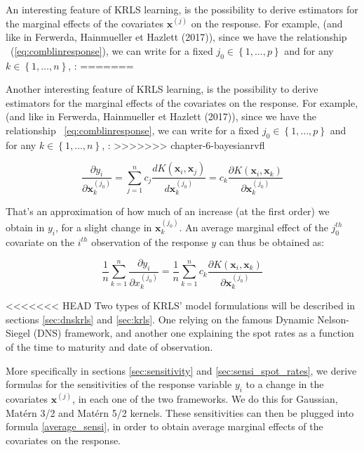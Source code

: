 An interesting feature of KRLS learning, is the possibility to derive estimators for the  marginal effects of the covariates $\textbf{x}^{(j)}$ on the response. For example, (and like in Ferwerda, Hainmueller et Hazlett (2017)), since we have the relationship ~(\ref{eq:comblinresponse}), we can write for a fixed $j_0 \in \left \lbrace 1, \ldots, p \right \rbrace$ and for any $k \in \left \lbrace 1, \ldots, n \right \rbrace $, :
=======

\medskip

Another interesting feature of KRLS learning, is the possibility to derive estimators for the  marginal effects of the covariates on the response. For example, (and like in Ferwerda, Hainmueller et Hazlett (2017)), since we have the relationship ~\ref{eq:comblinresponse}, we can write for a fixed $j_0 \in \left \lbrace 1, \ldots, p \right \rbrace$ and for any $k \in \left \lbrace 1, \ldots, n \right \rbrace $, :
>>>>>>> chapter-6-bayesianrvfl

\begin{equation}
\frac{\partial y_i}{\partial \textbf{x}_k^{(j_0)}} = \sum_{j = 1}^n c_j \frac{d K(\textbf{x}_i, \textbf{x}_j)}{d \textbf{x}_k^{(j_0)}} = c_k \frac{\partial K(\textbf{x}_i, \textbf{x}_k)}{\partial \textbf{x}_k^{(j_0)}}
\end{equation}

\medskip

That's an approximation of how much of an increase (at the first order) we obtain in $y_i$,  for a slight change in $\textbf{x}_k^{(j_0)}$. An average marginal effect of the $j_0^{th}$ covariate on the $i^{th}$ observation of the response $y$ can thus be obtained as:

\begin{equation}
\label{average_sensi}
\frac{1}{n}\sum_{k = 1}^n \frac{\partial y_i}{\partial x_k^{(j_0)}} = \frac{1}{n}\sum_{k = 1}^n c_k \frac{\partial K(\textbf{x}_i, \textbf{x}_k)}{\partial \textbf{x}_k^{(j_0)}}
\end{equation}

<<<<<<< HEAD
Two types of KRLS' model formulations will be described in sections \ref{sec:dnskrls} and \ref{sec:krls}. One relying on the famous Dynamic Nelson-Siegel (DNS) framework, and another one explaining the spot rates as a function of the time to maturity and date of observation. 

More specifically in sections \ref{sec:sensitivity} and \ref{sec:sensi_spot_rates}, we derive formulas for the sensitivities of the response variable $y_i$ to a change in the covariates $\textbf{x}^{(j)}$, in each one of the two frameworks. We do this for Gaussian, Mat\'ern 3/2 and Mat\'ern 5/2 kernels. These sensitivities can then be plugged into formula \ref{average_sensi}, in order to obtain average marginal effects of the covariates on the response.

